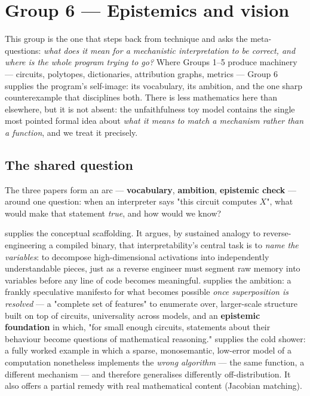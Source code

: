 


\section*{Group 6 --- Epistemics and vision}

\begin{callout}
This group is the one that steps back from technique and asks the meta-questions: \emph{what does it mean for a mechanistic interpretation to be correct, and where is the whole program trying to go?} Where Groups 1--5 produce machinery --- circuits, polytopes, dictionaries, attribution graphs, metrics --- Group 6 supplies the program's self-image: its vocabulary, its ambition, and the one sharp counterexample that disciplines both. There is less mathematics here than elsewhere, but it is not absent: the unfaithfulness toy model contains the single most pointed formal idea about \emph{what it means to match a mechanism rather than a function}, and we treat it precisely.
\end{callout}


\subsection*{The shared question}

The three papers form an arc --- \textbf{vocabulary}, \textbf{ambition}, \textbf{epistemic check} --- around one question: when an interpreter says "this circuit computes $X$", what would make that statement \emph{true}, and how would we know?

\textcite{mech-interp-variables-bases} supplies the conceptual scaffolding. It argues, by sustained analogy to reverse-engineering a compiled binary, that interpretability's central task is to \emph{name the variables}: to decompose high-dimensional activations into independently understandable pieces, just as a reverse engineer must segment raw memory into variables before any line of code becomes meaningful. \textcite{interpretability-dreams} supplies the ambition: a frankly speculative manifesto for what becomes possible \emph{once superposition is resolved} --- a "complete set of features" to enumerate over, larger-scale structure built on top of circuits, universality across models, and an \textbf{epistemic foundation} in which, "for small enough circuits, statements about their behaviour become questions of mathematical reasoning." \textcite{toy-model-of-mechanistic-unfaithfulness} supplies the cold shower: a fully worked example in which a sparse, monosemantic, low-error model of a computation nonetheless implements the \emph{wrong algorithm} --- the same function, a different mechanism --- and therefore generalises differently off-distribution. It also offers a partial remedy with real mathematical content (Jacobian matching).

